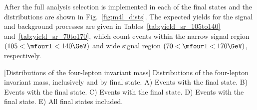 After the full analysis selection is implemented in each of the \fourl final states and the distributions are shown in Fig.~\ref{fig:m4l_dists}.
The expected yields for the signal and background processes are given in Tables~\ref{tab:yield_sr_105to140} and~\ref{tab:yield_sr_70to170},
which count events within the narrow signal region $\left(105 < \mfourl < 140\GeV\right)$ and wide signal region $\left(70 < \mfourl < 170\GeV\right)$, respectively.
\begin{multiFigure}
    \centering
        [Distributions of the four-lepton invariant mass]
        {Distributions of the four-lepton invariant mass, inclusively and by final state.
        \;A) Events with the \fourmu final state.
        \;B) Events with the \foure final state.
        \;C) Events with the \twoetwomu final state.
        \;D) Events with the \twomutwoe final state.
        \;E) All final states included.}
    \label{fig:m4l_dists}
\end{multiFigure}

